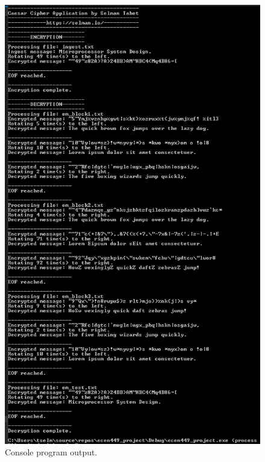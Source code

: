 \documentclass{article}
\begin{document}
\begin{figure}[!ht]
\begin{center}
\includegraphics[scale=0.7]{Figures/Q1run.png}
\end{center}
\caption {Console program output.}
\label{fig:q1}
\end{figure}

\pagebreak
\end{document}
